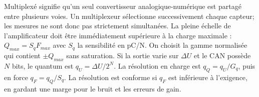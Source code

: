 \begin{corrigebox}
Multiplexé signifie qu'un seul convertisseur analogique-numérique est
            partagé entre plusieurs voies. Un multiplexeur sélectionne successivement
            chaque capteur; les mesures ne sont donc pas strictement simultanées.
La pleine échelle de l'amplificateur doit être immédiatement supérieure à
            la charge maximale : $Q_{max}=S_qF_{max}$ avec $S_q$ la sensibilité en pC/N.
            On choisit la gamme normalisée qui contient $\pm Q_{max}$ sans saturation.
Si la sortie varie sur $\Delta U$ et le CAN possède $N$ bits, le quantum
            est $q_U=\Delta U/2^N$. La résolution en charge est $q_Q=q_U/G_q$, puis en
            force $q_F=q_Q/S_q$. La résolution est conforme si $q_F$ est inférieure à
            l'exigence, en gardant une marge pour le bruit et les erreurs de gain.
\end{corrigebox}
